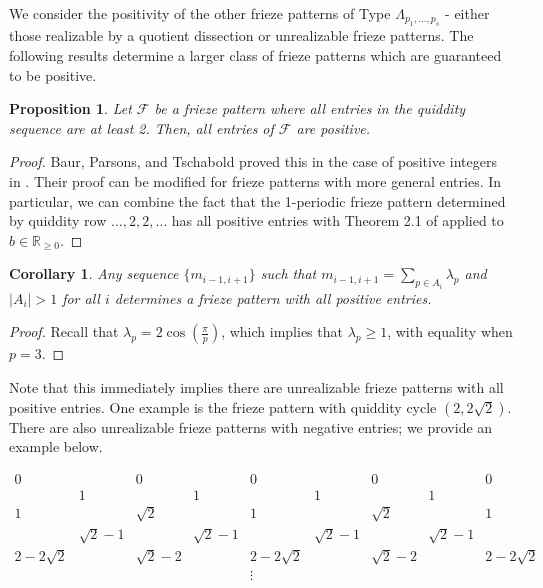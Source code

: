 \documentclass[12pt]{article}
\newtheorem{corollary}{Corollary}
\newtheorem{proposition}{Proposition}
\theoremstyle{remark}
\begin{document}
We consider the positivity of the other frieze patterns of Type $\Lambda_{p_1,\ldots,p_s}$ - either those realizable by a quotient dissection or unrealizable frieze patterns. The following results determine a larger class of frieze patterns which are guaranteed to be positive.

\begin{proposition}\label{prop:GreaterThan2}
Let $\mathcal{F}$ be a frieze pattern where all entries in the quiddity sequence are at least 2. Then, all entries of $\mathcal{F}$ are positive.
\end{proposition}

\begin{proof}
Baur, Parsons, and Tschabold proved this in the case of positive integers in \cite{1}. Their proof can be modified for frieze patterns with more general entries. In particular, we can combine the fact that the 1-periodic frieze pattern determined by quiddity row $\ldots, 2,2, \ldots$ has all positive entries with Theorem 2.1 of \cite{1} applied to $b \in \mathbb{R}_{\geq 0}$.
\end{proof}



\begin{corollary}
Any sequence $\{m_{i-1,i+1}\}$ such that $m_{i-1,i+1} = \sum_{p \in A_i}\lambda_p$ and $\vert A_i \vert > 1$ for all $i$ determines a frieze pattern with all positive entries.
\end{corollary}

\begin{proof}
Recall that $\lambda_p = 2\cos(\frac{\pi}{p})$, which implies that $\lambda_p \geq 1$, with equality when $p = 3$.
\end{proof}


Note that this immediately implies there are unrealizable frieze patterns with all positive entries. One example is the frieze pattern with quiddity cycle $(2, 2 \sqrt{2})$. There are also unrealizable frieze patterns with negative entries; we provide an example below.

$\begin{array}{cccccccccccccccccccc}
  0&&0&&0&&0&&0\\
 &1& &1&&1&&1&\\
 1&&\sqrt{2}&&1&&\sqrt{2}&&1 \\
&\sqrt{2}-1& &\sqrt{2}-1&&\sqrt{2}-1&&\sqrt{2}-1& \\
  2 - 2\sqrt{2}&& \sqrt{2} - 2&&2 - 2\sqrt{2}&&\sqrt{2} - 2&&2 - 2\sqrt{2}\\
  &&&&\vdots&&&&&& \\
 \end{array}$
\end{document}
